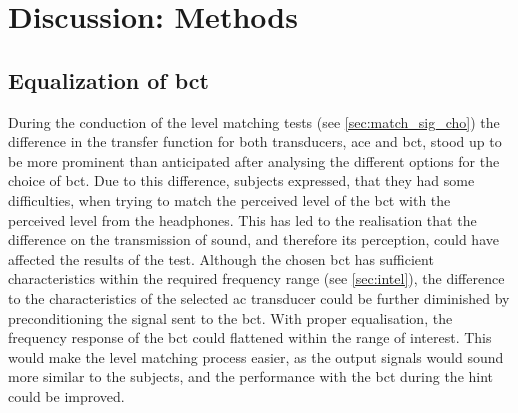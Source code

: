 \section{Discussion: Methods}\label{sec:disc_meth}

\subsection*{Equalization of \gls{bct}}
During the conduction of the level matching tests (see \autoref{sec:match_sig_cho}) the difference in the transfer function for both transducers, \gls{ace} and \gls{bct}, stood up to be more prominent than anticipated after analysing the different options for the choice of \gls{bct}. 
Due to this difference, subjects expressed, that they had some difficulties,  when trying to match the perceived level of the \gls{bct} with the perceived level from the headphones. 
This has led to the realisation that the difference on the transmission of sound, and therefore its perception, could have affected the results of the test.
Although the chosen \gls{bct} has sufficient characteristics within the required frequency range (see \autoref{sec:intel}), the difference to the characteristics of the selected \gls{ac} transducer could be further diminished by preconditioning the signal sent to the \gls{bct}.
With proper equalisation, the frequency response of the \gls{bct} could flattened within the range of interest. 
This would make the level matching process easier, as the output signals would sound more similar to the subjects, and the performance with the \gls{bct} during the \gls{hint} could be improved.

